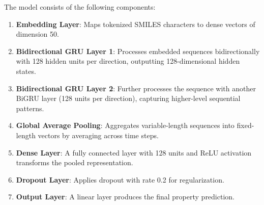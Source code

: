 \documentclass[11pt,a4paper]{article}
\begin{document}
The model consists of the following components:

\begin{enumerate}
    \item \textbf{Embedding Layer}: Maps tokenized SMILES characters to dense vectors of dimension 50.
    
    \item \textbf{Bidirectional GRU Layer 1}: Processes embedded sequences bidirectionally with 128 hidden units per direction, outputting 128-dimensional hidden states.
    
    \item \textbf{Bidirectional GRU Layer 2}: Further processes the sequence with another BiGRU layer (128 units per direction), capturing higher-level sequential patterns.
    
    \item \textbf{Global Average Pooling}: Aggregates variable-length sequences into fixed-length vectors by averaging across time steps.
    
    \item \textbf{Dense Layer}: A fully connected layer with 128 units and ReLU activation transforms the pooled representation.
    
    \item \textbf{Dropout Layer}: Applies dropout with rate 0.2 for regularization.
    
    \item \textbf{Output Layer}: A linear layer produces the final property prediction.
\end{enumerate}
\end{document}
